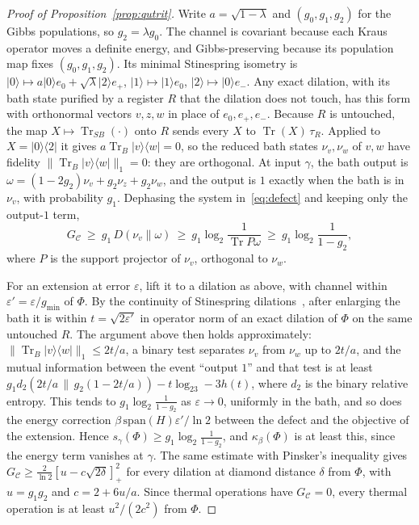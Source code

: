 \documentclass[11pt]{article}
\theoremstyle{definition}
\theoremstyle{remark}
\newcommand{\Tr}{\operatorname{Tr}}
\newcommand{\Trt}{\kappa_\beta}
\newcommand{\Dil}{\mathcal C}
\begin{document}
\begin{proof}[Proof of Proposition~\ref{prop:qutrit}]
Write $a=\sqrt{1-\lambda}$ and $(g_0,g_1,g_2)$ for the Gibbs populations, so $g_2=\lambda g_0$. The channel is covariant because each Kraus operator moves a definite energy, and Gibbs-preserving because its population map fixes $(g_0,g_1,g_2)$. Its minimal Stinespring isometry is $|0\rangle\mapsto a|0\rangle e_0+\sqrt\lambda|2\rangle e_+$, $|1\rangle\mapsto|1\rangle e_0$, $|2\rangle\mapsto|0\rangle e_-$. Any exact dilation, with its bath state purified by a register $R$ that the dilation does not touch, has this form with orthonormal vectors $v,z,w$ in place of $e_0,e_+,e_-$. Because $R$ is untouched, the map $X\mapsto\Tr_{SB}(\cdot)$ onto $R$ sends every $X$ to $\Tr(X)\,\tau_R$. Applied to $X=|0\rangle\langle2|$ it gives $a\Tr_B|v\rangle\langle w|=0$, so the reduced bath states $\nu_v,\nu_w$ of $v,w$ have fidelity $\|\Tr_B|v\rangle\langle w|\|_1=0$: they are orthogonal. At input $\gamma$, the bath output is $\omega=(1-2g_2)\nu_v+g_2\nu_z+g_2\nu_w$, and the output is $1$ exactly when the bath is in $\nu_v$, with probability $g_1$. Dephasing the system in~\eqref{eq:defect} and keeping only the output-$1$ term,
\[
G_{\Dil}\ \ge\ g_1\,D(\nu_v\|\omega)\ \ge\ g_1\log_2\frac1{\Tr P\omega}\ \ge\ g_1\log_2\frac1{1-g_2},
\]
where $P$ is the support projector of $\nu_v$, orthogonal to $\nu_w$.

For an extension at error $\varepsilon$, lift it to a dilation as above, with channel within $\varepsilon'=\varepsilon/g_{\min}$ of $\Phi$. By the continuity of Stinespring dilations~\cite{KSW08}, after enlarging the bath it is within $t=\sqrt{2\varepsilon'}$ in operator norm of an exact dilation of $\Phi$ on the same untouched $R$. The argument above then holds approximately: $\|\Tr_B|v\rangle\langle w|\|_1\le2t/a$, a binary test separates $\nu_v$ from $\nu_w$ up to $2t/a$, and the mutual information between the event ``output $1$'' and that test is at least $g_1d_2(2t/a\,\|\,g_2(1-2t/a))-t\log_23-3h(t)$, where $d_2$ is the binary relative entropy. This tends to $g_1\log_2\frac1{1-g_2}$ as $\varepsilon\to0$, uniformly in the bath, and so does the energy correction $\beta\,\mathrm{span}(H)\varepsilon'/\ln2$ between the defect and the objective of the extension. Hence $s_\gamma(\Phi)\ge g_1\log_2\frac1{1-g_2}$, and $\Trt(\Phi)$ is at least this, since the energy term vanishes at $\gamma$. The same estimate with Pinsker's inequality gives $G_{\Dil}\ge\frac2{\ln2}[u-c\sqrt{2\delta}]_+^2$ for every dilation at diamond distance $\delta$ from $\Phi$, with $u=g_1g_2$ and $c=2+6u/a$. Since thermal operations have $G_{\Dil}=0$, every thermal operation is at least $u^2/(2c^2)$ from $\Phi$.
\end{proof}
\end{document}
